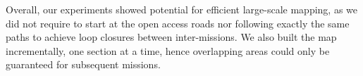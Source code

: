 Overall, our experiments showed potential for efficient large-scale mapping, as we did not require to start at the open access roads nor following exactly the same paths to achieve loop closures between inter-missions. We also built the map incrementally, one section at a time, hence overlapping areas could only be guaranteed for subsequent missions.



